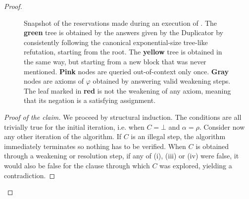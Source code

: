\begin{proof}
\begin{figure}[t]
{
    }
    \caption{Snapshot of the reservations made during an execution of . The \textcolor{green!60!black}{\textbf{green}} tree is obtained by the answers given by the Duplicator by consistently following the canonical exponential-size tree-like refutation, starting from the root. The \textcolor{yellow!80!black}{\textbf{yellow}} tree is obtained in the same way, but starting from a new block that was never mentioned. \textcolor{pink!85!black}{\textbf{Pink}} nodes are queried out-of-context only once. \textcolor{gray!70}{\textbf{Gray}} nodes are axioms of $\varphi$ obtained by answering valid weakening steps. The leaf marked in \textcolor{red!70!black}{\textbf{red}} is not the weakening of any axiom, meaning that its negation is a satisfying assignment.} 
    \label{fig:extraction}
\end{figure}

    \begin{proof}[Proof of the claim]
        We proceed by structural induction. The conditions are all trivially true for the initial iteration, i.e. when $C = \bot$ and $\alpha = \rho$. Consider now any other iteration of the algorithm. If $C$ is an illegal step, the algorithm immediately terminates so nothing has to be verified. When $C$ is obtained through a weakening or resolution step, if any of (i), (iii) or (iv) were false, it would also be false for the clause through which $C$ was explored, yielding a contradiction.


\end{proof}
\end{proof}
